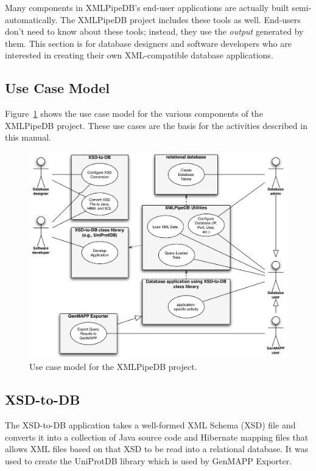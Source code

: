 \documentclass[11pt]{article}
\begin{document}
Many components in XMLPipeDB's end-user applications are actually built semi-au\-to\-mat\-ic\-al\-ly.  The XMLPipeDB project includes these tools as well.  End-users don't need to know about these tools; instead, they use the \emph{output} generated by them.  This section is for database designers and software developers who are interested in creating their own XML-compatible database applications.

\subsection{Use Case Model}

Figure~\ref{usecase} shows the use case model for the various components of the XMLPipeDB project.  These use cases are the basis for the activities described in this manual.

\begin{figure}[htbp] %
   \centering
   \includegraphics[width=5.5in]{figures/use-cases.pdf} 
   \caption{Use case model for the XMLPipeDB project.}
   \label{usecase}
\end{figure}

\subsection{XSD-to-DB}

The XSD-to-DB application takes a well-formed XML Schema (XSD) file and converts it into a collection of Java source code and Hibernate mapping files that allows XML files based on that XSD to be read into a relational database.  It was used to create the UniProtDB library which is used by GenMAPP Exporter.
\end{document}

